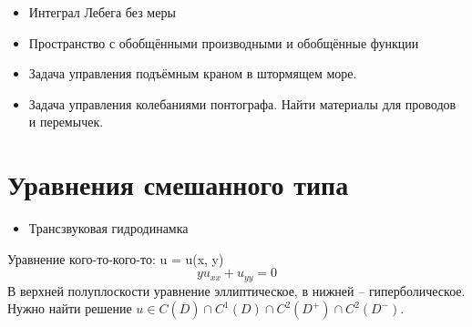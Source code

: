 \documentclass[11pt]{article}
\author{Sergey Makarov}
\date{\today}
\title{}
\begin{document}
\tableofcontents

\begin{itemize}
\item Интеграл Лебега без меры
\item Пространство с обобщёнными производными и обобщённые функции
\item Задача управления подъёмным краном в штормящем море.
\item Задача управления колебаниями понтографа. Найти материалы для проводов и перемычек.
\end{itemize}

\section{Уравнения смешанного типа}
\label{sec:org74772a8}
\begin{itemize}
\item Трансзвуковая гидродинамка
\end{itemize}
Уравнение кого-то-кого-то:
u = u(x, y)
\begin{equation}
yu_{xx} + u_{yy} = 0
\end{equation}
В верхней полуплоскости уравнение эллиптическое, в нижней -- гиперболическое. Нужно найти
решение $u \in C(\overline{D}) \cap C^1(D) \cap C^2(D^+) \cap C^2(D^-)$.
\end{document}
